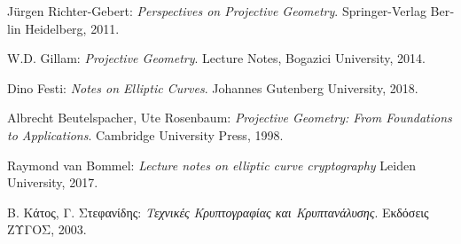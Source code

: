 \documentclass[12pt, a4paper]{book}
\begin{document}
\begin{thebibliography}{}
\bibitem{} 
\textlatin{Jürgen Richter-Gebert:
\textit{Perspectives on Projective Geometry}. 
Springer-Verlag Berlin Heidelberg, 2011.}


\bibitem{} 
\textlatin{W.D. Gillam:
\textit{Projective Geometry}. 
Lecture Notes, Bogazici University,  2014.}


\bibitem{} 
\textlatin{Dino Festi:
\textit{Notes on Elliptic Curves}. 
 Johannes Gutenberg University, 2018.}
 

\bibitem{} 
\textlatin{Albrecht Beutelspacher, Ute Rosenbaum:
\textit{Projective Geometry: From Foundations to Applications}. 
Cambridge University Press, 1998.}


\bibitem{} 
\textlatin{Raymond van Bommel:
\textit{Lecture notes on elliptic curve cryptography} 
Leiden University, 2017.}

\bibitem{} 
Β. Κάτος, Γ. Στεφανίδης: 
\textit{Τεχνικές Κρυπτογραφίας και Κρυπτανάλυσης}. 
Εκδόσεις ΖΥΓΟΣ, 2003.



\thispagestyle{empty}
\end{thebibliography}
\end{document}
